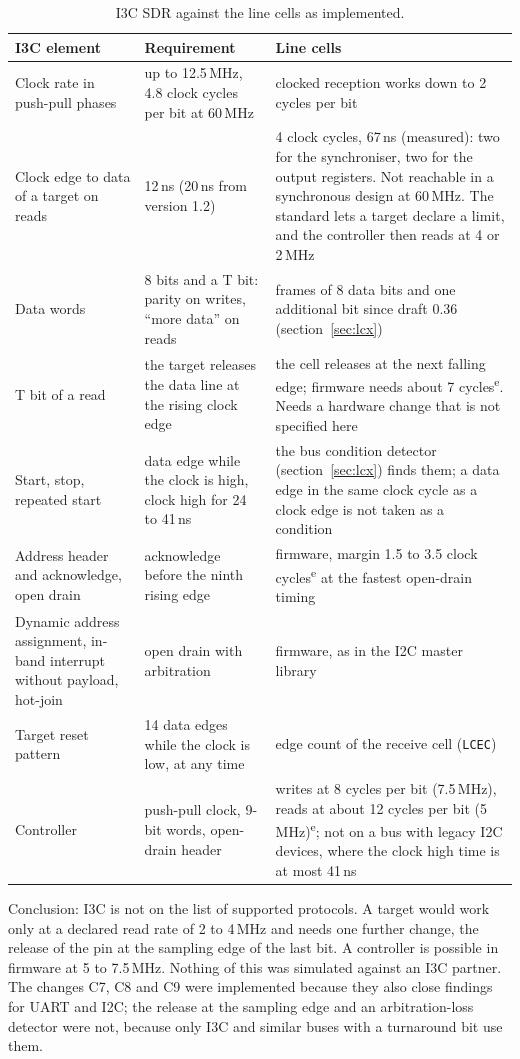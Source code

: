 \documentclass[10pt,a4paper]{article}
\newcommand{\est}{\textsuperscript{e}}
\newcommand{\reg}[1]{\texttt{#1}}
\begin{document}
\begin{table}[H]
\centering\small
\begin{tabularx}{\linewidth}{@{}LLL@{}}
\toprule
I3C element & Requirement & Line cells \\
\midrule
Clock rate in push-pull phases & up to 12.5\,MHz, 4.8 clock cycles per bit at 60\,MHz & clocked reception works down to 2 cycles per bit \\
Clock edge to data of a target on reads & 12\,ns (20\,ns from version 1.2) & 4 clock cycles, 67\,ns (measured): two for the synchroniser, two for the output registers. Not reachable in a synchronous design at 60\,MHz. The standard lets a target declare a limit, and the controller then reads at 4 or 2\,MHz \\
Data words & 8 bits and a T bit: parity on writes, ``more data'' on reads & frames of 8 data bits and one additional bit since draft 0.36 (section~\ref{sec:lcx}) \\
T bit of a read & the target releases the data line at the rising clock edge & the cell releases at the next falling edge; firmware needs about 7 cycles\est. Needs a hardware change that is not specified here \\
Start, stop, repeated start & data edge while the clock is high, clock high for 24 to 41\,ns & the bus condition detector (section~\ref{sec:lcx}) finds them; a data edge in the same clock cycle as a clock edge is not taken as a condition \\
Address header and acknowledge, open drain & acknowledge before the ninth rising edge & firmware, margin 1.5 to 3.5 clock cycles\est{} at the fastest open-drain timing \\
Dynamic address assignment, in-band interrupt without payload, hot-join & open drain with arbitration & firmware, as in the I2C master library \\
Target reset pattern & 14 data edges while the clock is low, at any time & edge count of the receive cell (\reg{LCEC}) \\
Controller & push-pull clock, 9-bit words, open-drain header & writes at 8 cycles per bit (7.5\,MHz), reads at about 12 cycles per bit (5\,MHz)\est; not on a bus with legacy I2C devices, where the clock high time is at most 41\,ns \\
\bottomrule
\end{tabularx}
\caption{I3C SDR against the line cells as implemented.}
\end{table}

Conclusion: I3C is not on the list of supported protocols. A target would work only at a declared read rate of
2 to 4\,MHz and needs one further change, the release of the pin at the sampling edge of the last
bit. A controller is possible in firmware at 5 to 7.5\,MHz. Nothing of this was simulated against an I3C
partner. The changes C7, C8 and C9 were implemented because they also close findings for UART
and I2C; the release at the sampling edge and an arbitration-loss detector were not, because only I3C and
similar buses with a turnaround bit use them.
\end{document}
